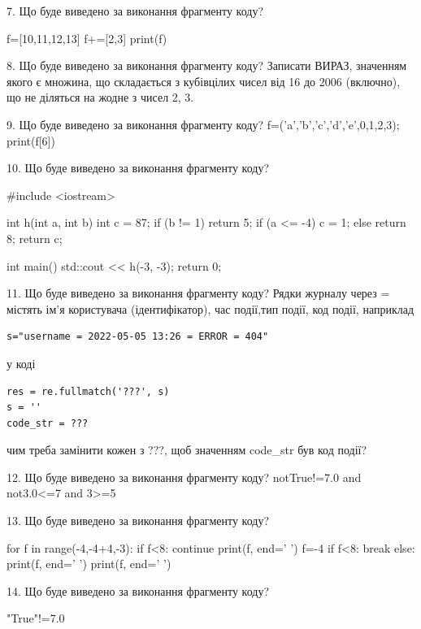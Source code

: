 \documentclass[11pt]{article}
\begin{document}

7. Що буде виведено за виконання фрагменту коду?

f=[10,11,12,13]
f+=[2,3]
print(f)



8. Що буде виведено за виконання фрагменту коду?
Записати ВИРАЗ, значенням якого є множина, що складається з кубівцілих чисел від 16 до 2006 (включно), що не діляться на жодне з чисел 2, 3.

9. Що буде виведено за виконання фрагменту коду?
f=('a','b','c','d','e',0,1,2,3); print(f[6])

10. Що буде виведено за виконання фрагменту коду?

#include <iostream>

int h(int a, int b){
    int c = 87;
    if (b != 1)
        return 5;
    if (a <= -4)
         c = 1;
    else 
        return 8;
    return c;
}

int main(){
    std::cout << h(-3, -3);
    return 0;
}


11. Що буде виведено за виконання фрагменту коду?
Рядки журналу через = містять ім'я користувача (ідентифікатор), час події,тип події, код події, наприклад
\begin{verbatim}
s="username = 2022-05-05 13:26 = ERROR = 404"
\end{verbatim}
у коді 
\begin{verbatim}
res = re.fullmatch('???', s) 
s = ''
code_str = ??? 
\end{verbatim}
чим треба замінити кожен з ???, щоб значенням code\_str був код події? 




12. Що буде виведено за виконання фрагменту коду?
notTrue!=7.0 and not3.0<=7 and 3>=5

13. Що буде виведено за виконання фрагменту коду?

for f in range(-4,-4+4,-3):
    if f<8:
        continue
    print(f, end=' ')
    f=-4
    if f<8:
        break
else:
    print(f, end=' ')
print(f, end=' ')


14. Що буде виведено за виконання фрагменту коду?

"True"!=7.0

\end{document}
